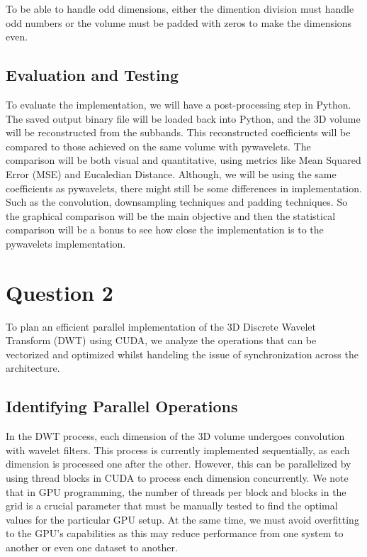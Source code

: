 \documentclass{article}
\begin{document}
To be able to handle odd dimensions, either the dimention division must handle odd numbers or the volume must be padded with zeros to make the dimensions even.\\

\subsection{Evaluation and Testing}
To evaluate the implementation, we will have a post-processing step in Python. The saved output binary file will be loaded back into Python, and the 3D volume will be reconstructed from the subbands. This reconstructed coefficients will be compared to those achieved on the same volume with pywavelets. The comparison will be both visual and quantitative, using metrics like Mean Squared Error (MSE) and Eucaledian Distance. Although, we will be using the same coefficients as pywavelets, there might still be some differences in implementation. Such as the convolution, downsampling techniques and padding techniques. So the graphical comparison will be the main objective and then the statistical comparison will be a bonus to see how close the implementation is to the pywavelets implementation.\\

\section{Question 2}
To plan an efficient parallel implementation of the 3D Discrete Wavelet Transform (DWT) using CUDA, we analyze the operations that can be vectorized and optimized whilst handeling the issue of synchronization across the architecture.

\subsection{Identifying Parallel Operations}
In the DWT process, each dimension of the 3D volume undergoes convolution with wavelet filters. This process is currently implemented sequentially, as each dimension is processed one after the other. However, this can be parallelized by using thread blocks in CUDA to process each dimension concurrently. We note that in GPU programming, the number of threads per block and blocks in the grid is a crucial parameter that must be manually tested to find the optimal values for the particular GPU setup. At the same time, we must avoid overfitting to the GPU's capabilities as this may reduce performance from one system to another or even one dataset to another.\\
\end{document}

